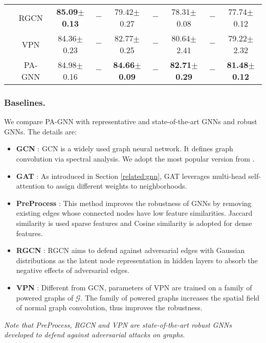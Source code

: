 \documentclass[sigconf]{acmart}
\newcommand{\our}{{PA-GNN}\xspace}
\def \G {\mathcal{G}}
\begin{document}
\begin{table*}[!t]
\begin{tabular}{c|c|ccccccc}
                            & RGCN                 & \textbf{85.09$\pm$0.13} & $-$            & 79.42$\pm$0.27 & $-$            & 78.31$\pm$0.08 & $-$            & 77.74$\pm$0.12 \\
                            & VPN              & 84.36$\pm$0.23 & $-$            & 82.77$\pm$0.25 & $-$            & 80.64$\pm$2.41 & $-$            & 79.22$\pm$2.32 \\
                            & \our & 84.98$\pm$0.16 & $-$            & \textbf{84.66$\pm$0.09} & $-$            & \textbf{82.71$\pm$0.29} & $-$            & \textbf{81.48$\pm$0.12} \\
                            \hline
\end{tabular}
\end{table*}

\subsubsection{Baselines.}
We compare \our with representative and state-of-the-art GNNs and robust GNNs. The details are:
\begin{itemize}[leftmargin=*]
    \item \textbf{GCN} \cite{kipf2016semi}: GCN is a widely used graph neural network. It defines graph convolution via spectral analysis.  We adopt the most popular version from \cite{kipf2016semi}.
    \item \textbf{GAT} \cite{hamilton2017inductive}: As introduced in Section \ref{related:gnn}, GAT leverages multi-head self-attention to assign different weights to neighborhoods.
    \item \textbf{PreProcess} \cite{wu2019adversarial}: This method improves the robustness of GNNs by removing existing edges whose connected nodes have low feature similarities. Jaccard similarity is used sparse features and Cosine similarity is adopted for dense features.
\item \textbf{RGCN} \cite{zhu2019robust}: RGCN aims to defend against adversarial edges with Gaussian distributions as the latent node representation in hidden layers to absorb the negative effects of adversarial edges.
    \item \textbf{VPN} \cite{jin2019power}: Different from GCN, parameters of VPN are trained on a family of powered graphs of $\G$. The family of powered graphs increases the spatial field of normal graph convolution, thus improves the robustness.
\end{itemize}
\textit{Note that PreProcess, RGCN and VPN are state-of-the-art robust GNNs developed to defend against adversarial attacks on graphs.}
\end{document}
